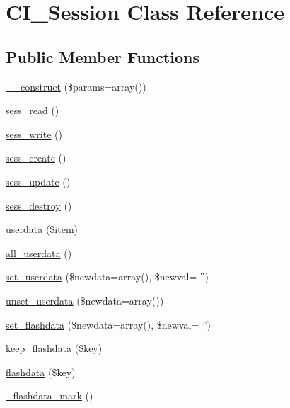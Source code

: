 \hypertarget{class_c_i___session}{\section{C\-I\-\_\-\-Session Class Reference}
\label{class_c_i___session}
}
\subsection*{Public Member Functions}
\begin{DoxyCompactItemize}
\item 
\hyperlink{class_c_i___session_a568ecdb0d73d2a870f33189739922a50}{\-\_\-\-\_\-construct} (\$params=array())
\item 
\hyperlink{class_c_i___session_ae5ba2069165f9af1c729d0573137d95a}{sess\-\_\-read} ()
\item 
\hyperlink{class_c_i___session_acd5ba33f5ff68a7c9ee9d1d8f0d8a237}{sess\-\_\-write} ()
\item 
\hyperlink{class_c_i___session_af210b7940693f8bbe707c5e3051f2e6c}{sess\-\_\-create} ()
\item 
\hyperlink{class_c_i___session_a333d608511ddfdee6717a8d474ff111f}{sess\-\_\-update} ()
\item 
\hyperlink{class_c_i___session_a9451d1625c402b8d712aedaa5ebc752d}{sess\-\_\-destroy} ()
\item 
\hyperlink{class_c_i___session_a234cc3c1e955a6da95092107cb2a8ac6}{userdata} (\$item)
\item 
\hyperlink{class_c_i___session_a974fa60ddc074b14ffcc78ef9902bc5c}{all\-\_\-userdata} ()
\item 
\hyperlink{class_c_i___session_aa2116dc78b715fb8f5f7234deba8cf79}{set\-\_\-userdata} (\$newdata=array(), \$newval= '')
\item 
\hyperlink{class_c_i___session_a57e126e7c8c9081641cf7642cb7e0e83}{unset\-\_\-userdata} (\$newdata=array())
\item 
\hyperlink{class_c_i___session_a00227f8b40e21cce8905a9ae7b73e151}{set\-\_\-flashdata} (\$newdata=array(), \$newval= '')
\item 
\hyperlink{class_c_i___session_a1e25514ba8dbd132db06cbedc6412158}{keep\-\_\-flashdata} (\$key)
\item 
\hyperlink{class_c_i___session_a6a8a92e8b35ab1ba980f64d8d0af298b}{flashdata} (\$key)
\item 
\hyperlink{class_c_i___session_add8c0608531c88bf75a9b2e82341163e}{\-\_\-flashdata\-\_\-mark} ()
\item 

\end{DoxyCompactItemize}
